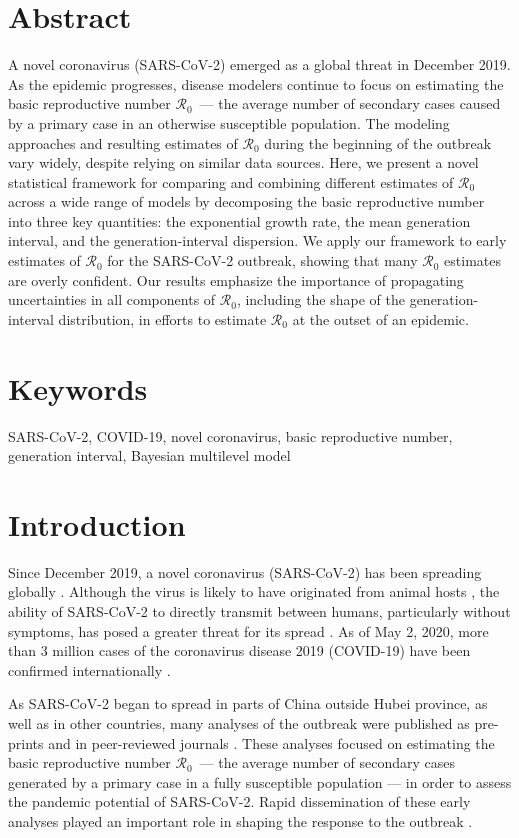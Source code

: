 \documentclass[12pt]{article}
\newcommand{\Ro}{\ensuremath{{\mathcal R}_{0}}\xspace}
\begin{document}
\section*{Abstract}
A novel coronavirus (SARS-CoV-2) emerged as a global threat in December 2019. 
As the epidemic progresses, disease modelers continue to focus on estimating the basic reproductive number \Ro\ --- the average number of secondary cases caused by a primary case in an otherwise susceptible population.
The modeling approaches and resulting estimates of \Ro during the beginning of the outbreak vary widely, despite relying on similar data sources.
Here, we present a novel statistical framework for comparing and combining different estimates of \Ro across a wide range of models by decomposing the basic reproductive number into three key quantities: the exponential growth rate, the mean generation interval, and the generation-interval dispersion.
We apply our framework to early estimates of \Ro for the SARS-CoV-2 outbreak, showing that many \Ro estimates are overly confident.
Our results emphasize the importance of propagating uncertainties in all components of \Ro, including the shape of the generation-interval distribution, in efforts to estimate \Ro at the outset of an epidemic.

\section*{Keywords}

SARS-CoV-2, COVID-19, novel coronavirus, basic reproductive number, generation interval, Bayesian multilevel model

\section{Introduction}

Since December 2019, a novel coronavirus (SARS-CoV-2) has been spreading globally \citep{pneumonia}.
Although the virus is likely to have originated from animal hosts \citep{andersen2020proximal}, the ability of SARS-CoV-2 to directly transmit between humans, particularly without symptoms, has posed a greater threat for its spread \citep{he2020temporal}.
As of May 2, 2020, more than 3 million cases of the coronavirus disease 2019 (COVID-19) have been confirmed internationally \citep{who103}.

As SARS-CoV-2 began to spread in parts of China outside Hubei province, as well as in other countries, many analyses of the outbreak were published as pre-prints \citep{bedfordncov, imaincov, liuncov, majumderncov, readncov, zhaoncov} and in peer-reviewed journals \citep{li2020early, riou2020pattern, wu2020nowcasting, zhao2020preliminary}.
These analyses focused on estimating the basic reproductive number \Ro\ --- the average number of secondary cases generated by a primary case in a fully susceptible population \citep{anderson1991infectious, diekmann1990definition} --- in order to assess the pandemic potential of SARS-CoV-2.
Rapid dissemination of these early analyses played an important role in shaping the response to the outbreak \citep{majumder2020early}.
\end{document}
